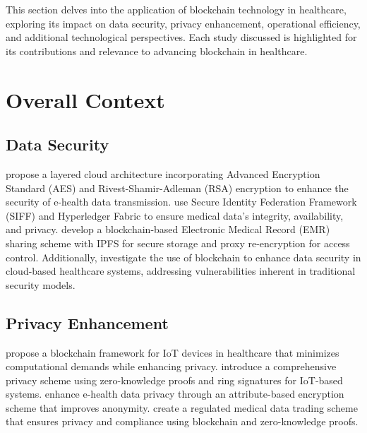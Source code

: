 \documentclass[cic,tc,english]{iiufrgs}
\begin{document}
    This section delves into the application of blockchain technology in healthcare, exploring its impact on data security, privacy enhancement, operational efficiency, and additional technological perspectives. Each study discussed is highlighted for its contributions and relevance to advancing blockchain in healthcare.




    \section{Overall Context}
        \label{sec:overallcontext}
            
        \subsection{Data Security} 
            \citet{Memos2021} propose a layered cloud architecture incorporating Advanced Encryption Standard (AES) and Rivest-Shamir-Adleman (RSA) encryption to enhance the security of e-health data transmission. \citet{Tian2019} use Secure Identity Federation Framework (SIFF) and Hyperledger Fabric to ensure medical data's integrity, availability, and privacy. \citet{Liu2024} develop a blockchain-based Electronic Medical Record (EMR) sharing scheme with IPFS for secure storage and proxy re-encryption for access control. Additionally, \citet{Esposito2018} investigate the use of blockchain to enhance data security in cloud-based healthcare systems, addressing vulnerabilities inherent in traditional security models.
        
        \subsection{Privacy Enhancement} 
            \citet{Dwivedi2019} propose a blockchain framework for IoT devices in healthcare that minimizes computational demands while enhancing privacy. \citet{Esfahani2024} introduce a comprehensive privacy scheme using zero-knowledge proofs and ring signatures for IoT-based systems. \citet{Zala2024} enhance e-health data privacy through an attribute-based encryption scheme that improves anonymity. \citet{Li2024} create a regulated medical data trading scheme that ensures privacy and compliance using blockchain and zero-knowledge proofs.
        
\end{document}
